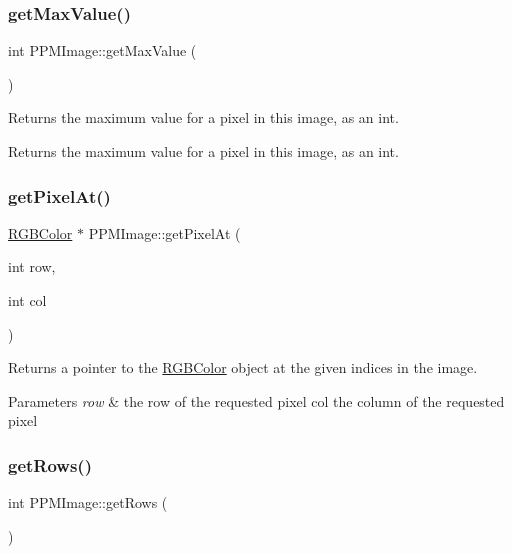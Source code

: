 \subsubsection{\texorpdfstring{get\+Max\+Value()}{getMaxValue()}}
{\footnotesize\ttfamily int P\+P\+M\+Image\+::get\+Max\+Value (\begin{DoxyParamCaption}{ }\end{DoxyParamCaption})}

Returns the maximum value for a pixel in this image, as an int.

\begin{DoxyReturn}{Returns}
the maximum value for a pixel in this image, as an int. 
\end{DoxyReturn}
\mbox{\label{classPPMImage_a812aa553ba32c6ebf901807fda170f1d}} 
\subsubsection{\texorpdfstring{get\+Pixel\+At()}{getPixelAt()}}
{\footnotesize\ttfamily \hyperlink{classRGBColor}{R\+G\+B\+Color} $\ast$ P\+P\+M\+Image\+::get\+Pixel\+At (\begin{DoxyParamCaption}\item[{int}]{row,  }\item[{int}]{col }\end{DoxyParamCaption})}

Returns a pointer to the \hyperlink{classRGBColor}{R\+G\+B\+Color} object at the given indices in the image.


\begin{DoxyParams}{Parameters}
{\em row} & the row of the requested pixel  col the column of the requested pixel \\
\hline
\end{DoxyParams}
\mbox{\label{classPPMImage_ac764135f24d3cb73ad364216f91f80d6}} 
\subsubsection{\texorpdfstring{get\+Rows()}{getRows()}}
{\footnotesize\ttfamily int P\+P\+M\+Image\+::get\+Rows (\begin{DoxyParamCaption}{ }\end{DoxyParamCaption})}

